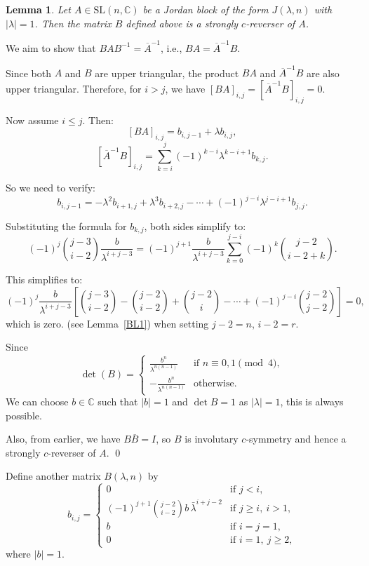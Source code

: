 \documentclass[11pt]{amsart}
\renewenvironment{proof}{{\bfseries Proof.}}{\qed}
\numberwithin{equation}{section}
\theoremstyle{plain}
\newtheorem{lemma}[theorem]{Lemma}
\theoremstyle{definition}
\numberwithin{equation}{section}
\begin{document}
	\begin{lemma}
Let \( A \in \mathrm{SL}(n,\mathbb{C}) \) be a Jordan block of the form \( J(\lambda,n) \) with \( |\lambda| = 1 \). Then the matrix \( B \) defined above is a strongly \( c \)-reverser of \( A \).
\end{lemma}

\begin{proof}
We aim to show that \( BAB^{-1} = \overline{A}^{-1} \), i.e., \( BA = \overline{A}^{-1}B \).

Since both \( A \) and \( B \) are upper triangular, the product \( BA \) and \( \overline{A}^{-1}B \) are also upper triangular. Therefore, for \( i > j \), we have \( [BA]_{i,j} = [\overline{A}^{-1}B]_{i,j} = 0 \).

Now assume \( i \leq j \). Then:
\[
[BA]_{i,j} = b_{i,j-1} + \lambda b_{i,j},
\]
\[
[\overline{A}^{-1}B]_{i,j} = \sum_{k=i}^j (-1)^{k-i} \lambda^{k-i+1} b_{k,j}.
\]

So we need to verify:
\[
b_{i,j-1} = -\lambda^2 b_{i+1,j} + \lambda^3 b_{i+2,j} - \cdots + (-1)^{j-i} \lambda^{j-i+1} b_{j,j}.
\]

Substituting the formula for \( b_{k,j} \), both sides simplify to:
\[
(-1)^j \binom{j-3}{i-2} \frac{b}{\lambda^{i+j-3}} = 
(-1)^{j+1} \frac{b}{\lambda^{i+j-3}} \sum_{k=0}^{j-i} (-1)^k \binom{j-2}{i-2+k}.
\]

This simplifies to:
\[
(-1)^j \frac{b}{\lambda^{i+j-3}} \left[ \binom{j-3}{i-2} - \binom{j-2}{i-2} + \binom{j-2}{i} - \cdots + (-1)^{j-i} \binom{j-2}{j-2} \right] = 0,
\]
which is zero.  (see Lemma~\ref{BL1}) when setting \( j - 2 = n \), \( i - 2 = r \).

Since
\[
\det(B) = 
\begin{cases}
\displaystyle \frac{b^{n}}{\lambda^{n(n-1)}} & \text{if } n \equiv 0,1 \pmod{4}, \\[8pt]
\displaystyle -\frac{b^{n}}{\lambda^{n(n-1)}} & \text{otherwise}.
\end{cases}
\]
We can choose \( b \in \mathbb{C} \) such that \( |b| = 1 \) and \( \det B = 1 \) as \( |\lambda| = 1 \), this is always possible.

Also, from earlier, we have \( B \overline{B} = I \), so \( B \) is involutary $c$-symmetry and hence a strongly \( c \)-reverser of \( A \).
\end{proof}

Define another matrix $B(\lambda,n)$ by
\[
b_{i,j} = 
\begin{cases}
0 & \text{if } j < i, \\
(-1)^{j+1} \binom{j-2}{i-2} b\, \bar{\lambda}^{i+j-2} & \text{if } j \geq i,\ i>1, \\
b & \text{if } i = j = 1, \\
0 & \text{if } i = 1,\ j \geq 2,
\end{cases}
\]
where $|b|=1$.
\end{document}
